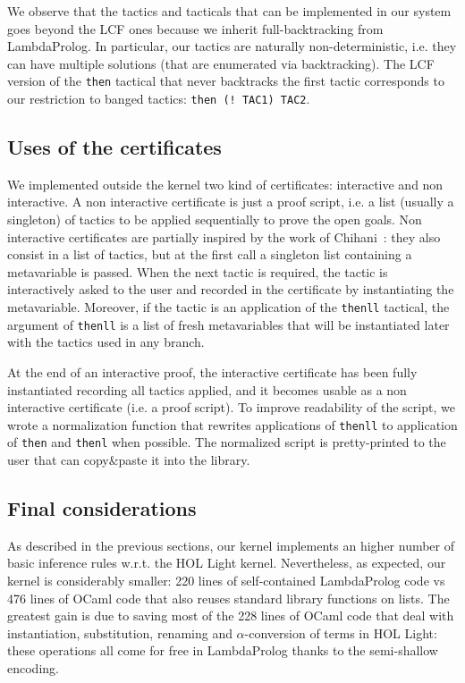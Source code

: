 \documentclass[preprint]{sigplanconf}
\begin{document}
We observe that the tactics and tacticals that can be implemented in our system goes beyond the LCF ones because we inherit full-backtracking from LambdaProlog. In particular, our tactics are naturally non-deterministic, i.e. they can have multiple solutions (that are enumerated via backtracking).
The LCF version of the \verb+then+ tactical that never backtracks the first tactic corresponds to our restriction to banged tactics: \verb+then (! TAC1) TAC2+.

\subsection{Uses of the certificates}

We implemented outside the kernel two kind of certificates: interactive and non interactive. A non interactive certificate is just a proof script, i.e. a list (usually a singleton) of tactics to be applied sequentially to prove the open goals. Non interactive certificates are partially inspired by the work of Chihani~\cite{chihaniXXX}: they also consist in a list of tactics, but at the first call a singleton list containing a metavariable is passed. When the next tactic is required, the tactic is interactively asked to the user and recorded in the certificate by instantiating the metavariable. Moreover, if the tactic is an application of the \texttt{thenll} tactical, the argument of \texttt{thenll} is a list of fresh metavariables that will be instantiated later with the tactics used in any branch.

At the end of an interactive proof, the interactive certificate has been fully instantiated recording all tactics applied, and it becomes usable as a non interactive certificate (i.e. a proof script). To improve readability of the script, we wrote a normalization function that rewrites applications of \texttt{thenll} to application of \texttt{then} and \texttt{thenl} when possible. The normalized script is pretty-printed to the user that can copy\&paste it into the library.

\subsection{Final considerations}

As described in the previous sections, our kernel implements an higher number
of basic inference rules w.r.t. the HOL Light kernel. Nevertheless, as expected, our kernel is considerably smaller: 220 lines of self-contained LambdaProlog code vs 476 lines of OCaml code that also reuses standard library functions on lists. The greatest gain is due to saving most of the 228 lines of OCaml code that deal with instantiation, substitution, renaming and $\alpha$-conversion of terms in HOL Light: these operations all come for free in LambdaProlog thanks to the semi-shallow encoding.
\end{document}
